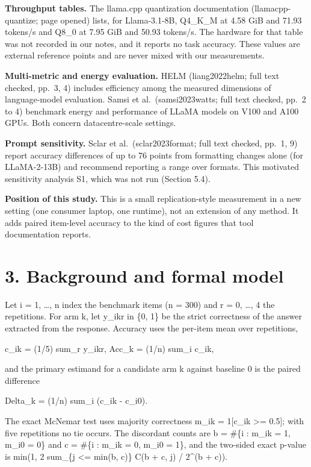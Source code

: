 \documentclass[
]{article}
\begin{document}
\textbf{Throughput tables.} The llama.cpp quantization documentation
(llamacpp-quantize; page opened) lists, for Llama-3.1-8B, Q4\_K\_M at
4.58 GiB and 71.93 tokens/s and Q8\_0 at 7.95 GiB and 50.93 tokens/s.
The hardware for that table was not recorded in our notes, and it
reports no task accuracy. These values are external reference points and
are never mixed with our measurements.

\textbf{Multi-metric and energy evaluation.} HELM (liang2022helm; full
text checked, pp.~3, 4) includes efficiency among the measured
dimensions of language-model evaluation. Samsi et al.~(samsi2023watts;
full text checked, pp.~2 to 4) benchmark energy and performance of LLaMA
models on V100 and A100 GPUs. Both concern datacentre-scale settings.

\textbf{Prompt sensitivity.} Sclar et al.~(sclar2023format; full text
checked, pp.~1, 9) report accuracy differences of up to 76 points from
formatting changes alone (for LLaMA-2-13B) and recommend reporting a
range over formats. This motivated sensitivity analysis S1, which was
not run (Section 5.4).

\textbf{Position of this study.} This is a small replication-style
measurement in a new setting (one consumer laptop, one runtime), not an
extension of any method. It adds paired item-level accuracy to the kind
of cost figures that tool documentation reports.

\section{3. Background and formal
model}\label{background-and-formal-model}

Let i = 1, \ldots, n index the benchmark items (n = 300) and r = 0,
\ldots, 4 the repetitions. For arm k, let y\_ikr in \{0, 1\} be the
strict correctness of the answer extracted from the response. Accuracy
uses the per-item mean over repetitions,

c\_ik = (1/5) sum\_r y\_ikr, Acc\_k = (1/n) sum\_i c\_ik,

and the primary estimand for a candidate arm k against baseline 0 is the
paired difference

Delta\_k = (1/n) sum\_i (c\_ik - c\_i0).

The exact McNemar test uses majority correctness m\_ik = 1{[}c\_ik
\textgreater= 0.5{]}; with five repetitions no tie occurs. The
discordant counts are b = \#\{i : m\_ik = 1, m\_i0 = 0\} and c = \#\{i :
m\_ik = 0, m\_i0 = 1\}, and the two-sided exact p-value is min(1, 2
sum\_\{j \textless= min(b, c)\} C(b + c, j) / 2\^{}(b + c)).
\end{document}
